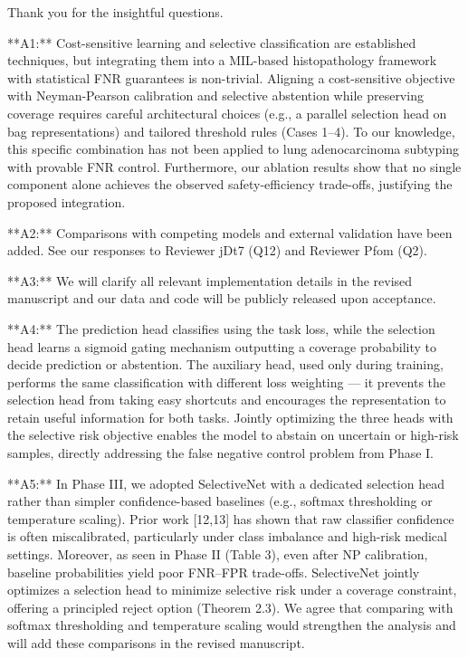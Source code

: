 Thank you for the insightful questions.

**A1:** Cost-sensitive learning and selective classification are established techniques, but integrating them into a MIL-based histopathology framework with statistical FNR guarantees is non-trivial. Aligning a cost-sensitive objective with Neyman-Pearson calibration and selective abstention while preserving coverage requires careful architectural choices (e.g., a parallel selection head on bag representations) and tailored threshold rules (Cases 1–4). To our knowledge, this specific combination has not been applied to lung adenocarcinoma subtyping with provable FNR control. Furthermore, our ablation results show that no single component alone achieves the observed safety-efficiency trade-offs, justifying the proposed integration.

**A2:** Comparisons with competing models and external validation have been added. See our responses to Reviewer jDt7 (Q12) and Reviewer Pfom (Q2).

**A3:** We will clarify all relevant implementation details in the revised manuscript and our data and code will be publicly released upon acceptance.

**A4:** The prediction head classifies using the task loss, while the selection head learns a sigmoid gating mechanism outputting a coverage probability to decide prediction or abstention. The auxiliary head, used only during training, performs the same classification with different loss weighting — it prevents the selection head from taking easy shortcuts and encourages the representation to retain useful information for both tasks. Jointly optimizing the three heads with the selective risk objective enables the model to abstain on uncertain or high-risk samples, directly addressing the false negative control problem from Phase I.

**A5:** In Phase III, we adopted SelectiveNet with a dedicated selection head rather than simpler confidence-based baselines (e.g., softmax thresholding or temperature scaling). Prior work [12,13] has shown that raw classifier confidence is often miscalibrated, particularly under class imbalance and high-risk medical settings. Moreover, as seen in Phase II (Table 3), even after NP calibration, baseline probabilities yield poor FNR–FPR trade-offs. SelectiveNet jointly optimizes a selection head to minimize selective risk under a coverage constraint, offering a principled reject option (Theorem 2.3). We agree that comparing with softmax thresholding and temperature scaling would strengthen the analysis and will add these comparisons in the revised manuscript.